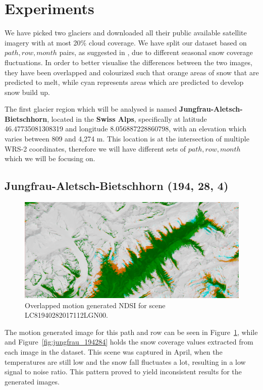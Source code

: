 \documentclass[12pt, a4paper]{report}
\begin{document}
	\section{Experiments}
	\label{seq:experiments}
	
	\par We have picked two glaciers and downloaded all their public available satellite imagery with at most 20\% cloud coverage. We have split our dataset based on \(path, row, month\) pairs, as suggested in \cite{RACOVITEANU2019}, due to different seasonal snow coverage fluctuations. In order to better visualise the differences between the two images, they have been
	overlapped and colourized such that orange areas of snow that are predicted to melt,
	while cyan represents areas which are predicted to develop snow build up.
	
	\par The first glacier region which will be analysed is named \textbf{Jungfrau-Aletsch-Bietschhorn}, located in the \textbf{Swiss Alps}, specifically at latitude 46.47735081308319 and longitude 8.056887228860798, with an elevation which varies between 809 and 4,274 m. This location is at the intersection of multiple WRS-2 coordinates, therefore we will have different sets of \(path, row, month\) which we will be focusing on.
	
	\subsection{Jungfrau-Aletsch-Bietschhorn (194, 28, 4)}
	
	\begin{figure}[h!]
		\centering
		\includegraphics[width=\linewidth]{../images/experiment_1940284_image.png}
		\caption{Overlapped motion generated NDSI for scene LC81940282017112LGN00.}
		\label{fig:experiment_1940284_image}
	\end{figure}

	The motion generated image for this path and row can be seen in Figure~\ref{fig:experiment_1940284_image}, while and Figure~\ref{fig:jungfrau_194284} holds the snow coverage values extracted from each image in the dataset. This scene was captured in April, when the temperatures are still low and the snow fall fluctuates a lot, resulting in a low signal to noise ratio. This pattern proved to yield inconsistent results for the generated images.
	
\end{document}

